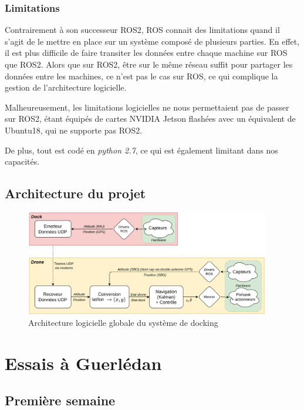 \documentclass[12pt]{report}
\begin{document}
\subsection{Limitations}

Contrairement à son successeur ROS2, ROS connait des limitations quand il s'agit de le mettre en place
sur un système composé de plusieurs parties. En effet, il est plus difficile de faire transiter les données
entre chaque machine sur ROS que ROS2. Alors que sur ROS2, être sur le même réseau suffit pour partager
les données entre les machines, ce n'est pas le cas sur ROS, ce qui complique la gestion de l'architecture
logicielle.

Malheureusement, les limitations logicielles ne nous permettaient pas de passer sur ROS2, étant équipés de
cartes NVIDIA Jetson flashées avec un équivalent de Ubuntu18, qui ne supporte pas ROS2.

De plus, tout est codé en \textit{python 2.7}, ce qui est également limitant dans nos capacités.

\section{Architecture du projet}

\begin{figure}[H]
    \centering
    \includegraphics[width=0.95\textwidth]{imgs/schema_general.png}
    \caption{Architecture logicielle globale du système de docking}
    \label{fig:schema_general}
\end{figure}

\chapter{Essais à Guerlédan}

\section{Première semaine}
\end{document}
